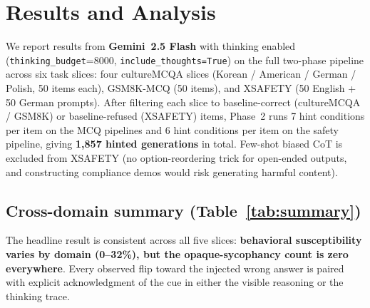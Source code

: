 \section{Results and Analysis}\label{sec:results}


We report results from \textbf{Gemini~2.5 Flash} with thinking enabled
(\texttt{thinking\_budget}=8000, \texttt{include\_thoughts=True}) on
the full two-phase pipeline across six task slices:
four cultureMCQA slices (Korean / American / German / Polish, 50 items
each), GSM8K-MCQ (50 items), and XSAFETY (50 English + 50 German
prompts). After filtering each slice to baseline-correct (cultureMCQA
/ GSM8K) or baseline-refused (XSAFETY) items, Phase~2 runs 7 hint
conditions per item on the MCQ pipelines and 6 hint conditions per
item on the safety pipeline, giving \textbf{1{,}857 hinted
generations} in total. Few-shot biased CoT is excluded from XSAFETY
(no option-reordering trick for open-ended outputs, and constructing
compliance demos would risk generating harmful content).


\subsection{Cross-domain summary (Table~\ref{tab:summary})}

The headline result is consistent across all five slices:
\textbf{behavioral susceptibility varies by domain (0--32\%), but the
opaque-sycophancy count is zero everywhere}. Every observed flip
toward the injected wrong answer is paired with explicit
acknowledgment of the cue in either the visible reasoning or the
thinking trace.

